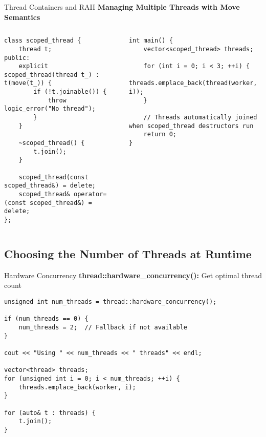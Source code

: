 \begin{frame}[fragile]{Thread Containers and RAII}
	\textbf{Managing Multiple Threads with Move Semantics}

	\begin{columns}
		\begin{column}{0.5\textwidth}
			\begin{verbatim}
class scoped_thread {
    thread t;
public:
    explicit scoped_thread(thread t_) : t(move(t_)) {
        if (!t.joinable()) {
            throw logic_error("No thread");
        }
    }

    ~scoped_thread() {
        t.join();
    }

    scoped_thread(const scoped_thread&) = delete;
    scoped_thread& operator=(const scoped_thread&) = delete;
};
            \end{verbatim}
		\end{column}
		\begin{column}{0.5\textwidth}
			\begin{verbatim}
int main() {
    vector<scoped_thread> threads;

    for (int i = 0; i < 3; ++i) {
        threads.emplace_back(thread(worker, i));
    }

    // Threads automatically joined when scoped_thread destructors run
    return 0;
}
	\end{verbatim}
		\end{column}
	\end{columns}
\end{frame}

\subsection{Choosing the Number of Threads at Runtime}

\begin{frame}[fragile]{Hardware Concurrency}
	\textbf{thread::hardware\_concurrency():} Get optimal thread count

	\begin{verbatim}
unsigned int num_threads = thread::hardware_concurrency();

if (num_threads == 0) {
    num_threads = 2;  // Fallback if not available
}

cout << "Using " << num_threads << " threads" << endl;

vector<thread> threads;
for (unsigned int i = 0; i < num_threads; ++i) {
    threads.emplace_back(worker, i);
}

for (auto& t : threads) {
    t.join();
}
	\end{verbatim}
\end{frame}

